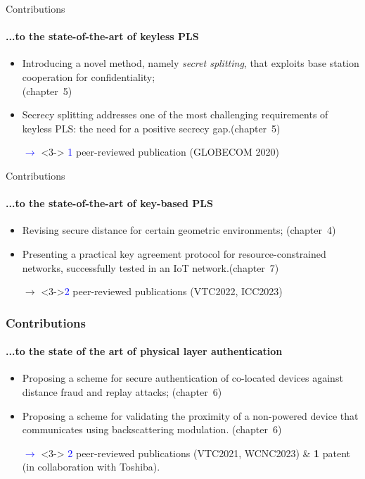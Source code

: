 \begin{frame}{Contributions}
\framesubtitle{...to the state-of-the-art of keyless PLS}
 \begin{itemize}
  \item<1-> Introducing a novel method, namely \textit{secret splitting}, that exploits base station cooperation for confidentiality;\\\hfill{(chapter~5)}
  \item<2-> Secrecy splitting addresses one of the most challenging requirements of keyless PLS: the need for a positive secrecy gap.\hfill{(chapter~5)}
\item[\textcolor{blue}{$\rightarrow$}]<3-> \textcolor{blue}{1} peer-reviewed publication (GLOBECOM 2020)
 
\end{itemize}

\end{frame}

\begin{frame}{Contributions}
\framesubtitle{...to the state-of-the-art of key-based PLS}

\begin{itemize}
    \item<1-> Revising secure distance for certain geometric environments; \hfill{(chapter~4)}
    \item<2-> Presenting a practical key agreement protocol for resource-constrained networks, successfully tested in an IoT network.\hfill{(chapter~7)}
    \item[$\rightarrow$]<3->\textcolor{blue}{2} peer-reviewed publications (VTC2022, ICC2023)
\end{itemize}

\end{frame}

\begin{frame}
\frametitle{Contributions}
\framesubtitle{...to the state of the art of physical layer authentication}
\begin{itemize}
    
    \item<1-> Proposing a scheme for secure authentication of co-located devices against distance fraud and replay attacks;
    \hfill{(chapter~6)}
    
    \item<2-> Proposing a scheme for validating the proximity of a non-powered device that communicates using backscattering modulation. \hfill{(chapter~6)}
    \item[\textcolor{blue}{$\rightarrow$}]<3-> \textcolor{blue}{2} peer-reviewed publications (VTC2021, WCNC2023) \& \textbf{1} patent (in collaboration with Toshiba).
\end{itemize}

\end{frame}

